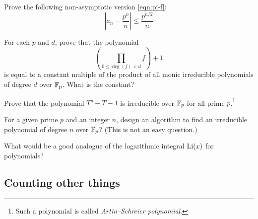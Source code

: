 \begin{exercise}
    Prove the following non-asymptotic version \eqref{eqn:pi-f}:
    \[
    \left|a_n - \frac{p^n}{n} \right| \le \frac{p^{n/2}}{n}
    \]
\end{exercise}

\begin{exercise}
    For each $p$ and $d$, prove that the polynomial
    \[
    \left(\prod_{0 \le \deg(f) < d} f\right) + 1
    \]
    is equal to a constant multiple of the product of all monic irreducible polynomials of degree $d$ over $\mathbb{F}_p$.
    What is the constant?
\end{exercise}

\begin{exercise}
    Prove that the polynomial $T^p - T - 1$ is irreducible over $\mathbb{F}_p$ for all prime $p$.\footnote{Such a polynomial is called \emph{Artin--Schreier polynomial}.}
\end{exercise}

\begin{exercise}\sage
    For a given prime $p$ and an integer $n$, design an algorithm to find an irreducible polynomial of degree $n$ over $\mathbb{F}_p$? (This is not an easy question.)
\end{exercise}

\begin{exercise}
    What would be a good analogue of the logarithmic integral $\mathrm{Li}(x)$ for polynomials?
\end{exercise}


\subsection{Counting other things}

\newpage
